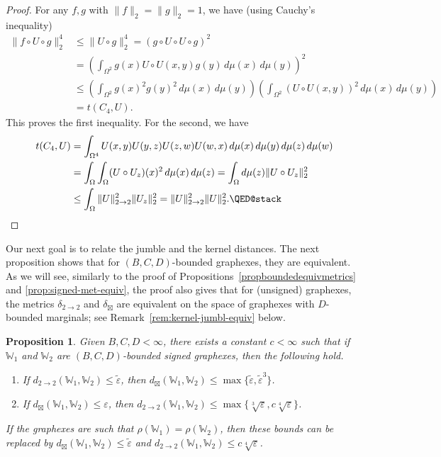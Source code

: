 \documentclass{amsart}
\numberwithin{equation}{section}
\numberwithin{figure}{section}
\newtheorem{proposition}[theorem]{Proposition}
\theoremstyle{definition}
\theoremstyle{remark}
\newcommand{\jbl}{{\boxtimes}}
\newcommand{\eps}{\varepsilon}
\newcommand{\cW}{\mathbb{W}}
\newcommand{\deltt}{\delta_{2\to 2}}
\def\d22{d_{2\to 2}}
\def\djbl{d_{\jbl}}
\def\deljbl{\delta_{\jbl}}
\begin{document}
\begin{proof}
For any $f,g$ with $\|f\|_2=\|g\|_2=1$, we have (using Cauchy's inequality)
\begin{align*}
\|f \circ U \circ g\|_2^4 &\le \|U \circ g\|_2^4
=(g \circ U \circ U \circ g)^2\\
&=\left(\int_{\Omega^2}g(x)U \circ U(x,y)g(y)\,d\mu(x)\,d\mu(y)\right)^2\\
&\le \left(\int_{\Omega^2}g(x)^2g(y)^2\,d\mu(x)\,d\mu(y)\right) \left( \int_{\Omega^2} (U \circ U(x,y))^2 \,d\mu(x)\,d\mu(y)\right)\\
&=t(C_4,U).
\end{align*}
This proves the first inequality. For the second, we have
\begin{align*}
t(C_4,U)&= \int_{\Omega^4} U(x,y)U(y,z)U(z,w)U(w,x)\,d\mu(x)\,d\mu(y)\,d\mu(z)\,d\mu(w)\\
& =
\int_{\Omega} \int_{\Omega}(U\circ U_z)(x)^2 \,d\mu(x)\,d\mu(z)
= \int_{\Omega} d\mu(z)\|U \circ U_z\|_2^2
\\
&\le \int_\Omega \|U\|_{2 \rightarrow 2}^2 \|U_z\|_2^2=\|U\|_{2 \rightarrow 2}^2\|U\|_2^2. \qedhere
\end{align*}
\end{proof}

Our next goal is to relate the jumble and the kernel distances. The next
proposition shows that for $(B,C,D)$-bounded graphexes, they are equivalent.
As we will see, similarly to the proof of
Propositions~\ref{propboundedequivmetrics} and \ref{prop:signed-met-equiv},
the proof also gives that for (unsigned) graphexes, the metrics $\deltt$ and
$\deljbl$ are equivalent on the space of graphexes with $D$-bounded
marginals; see Remark~\ref{rem:kernel-jumbl-equiv} below.

\begin{proposition}\label{prop:kernel-jumbl-equiv}
Given $B,C,D<\infty$, there exists a constant $c<\infty$ such that if $\cW_1$
and $\cW_2$ are $(B,C,D)$-bounded signed graphexes, then the following hold.
\begin{enumerate}
\item If $\d22(\cW_1,\cW_2)\leq \widetilde\eps$, then $\djbl(\cW_1,\cW_2)\leq \max\{\widetilde\eps,{\widetilde\eps}^3\}$.
\item If $\djbl(\cW_1,\cW_2)\leq \varepsilon$, then
    $\d22(\cW_1,\cW_2)\leq\max\{\sqrt[3]\eps,c\sqrt[4]{\eps}\}$.
\end{enumerate}
If the graphexes are such that $\rho(\cW_1)=\rho(\cW_2)$, then these bounds
can be replaced by $\djbl(\cW_1,\cW_2)\leq \widetilde\eps$ and
$\d22(\cW_1,\cW_2)\leq c\sqrt[4]{\eps}$.
\end{proposition}
\end{document}
